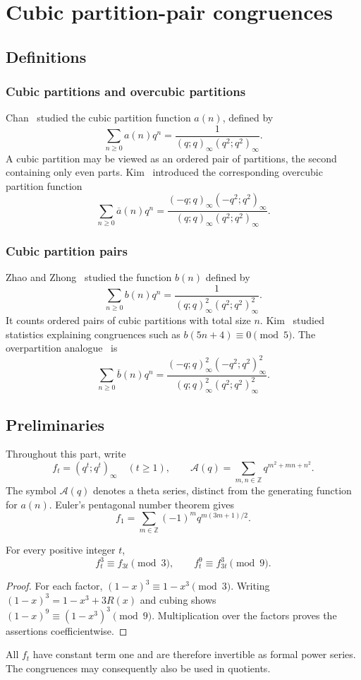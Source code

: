 \chapter{Cubic partition-pair congruences}
\section{Definitions}
\subsection{Cubic partitions and overcubic partitions}
Chan~\cite{chan1,chan2,chan3} studied the cubic partition function $a(n)$,
defined by
\[
 \sum_{n\ge0}a(n)q^n
 =\frac1{(q;q)_\infty(q^2;q^2)_\infty}.
\]
A cubic partition may be viewed as an ordered pair of partitions, the
second containing only even parts. Kim~\cite{kim1} introduced the
corresponding overcubic partition function
\[
 \sum_{n\ge0}\overline a(n)q^n
 =\frac{(-q;q)_\infty(-q^2;q^2)_\infty}
 {(q;q)_\infty(q^2;q^2)_\infty}.
\]

\subsection{Cubic partition pairs}
Zhao and Zhong~\cite{zhao1} studied the function $b(n)$ defined by
\begin{equation}\label{eq:b-gf}
 \sum_{n\ge0}b(n)q^n
 =\frac1{(q;q)_\infty^2(q^2;q^2)_\infty^2}.
\end{equation}
It counts ordered pairs of cubic partitions with total size $n$.
Kim~\cite{kim2} studied statistics explaining congruences such as
$b(5n+4)\equiv0\pmod5$.
The overpartition analogue~\cite{kim3} is
\[
 \sum_{n\ge0}\overline b(n)q^n
 =\frac{(-q;q)_\infty^2(-q^2;q^2)_\infty^2}
 {(q;q)_\infty^2(q^2;q^2)_\infty^2}.
\]

\section{Preliminaries}
Throughout this part, write
\[
 f_t=(q^t;q^t)_\infty\quad(t\ge1),\qquad
 \mathcal A(q)=\sum_{m,n\in\mathbb Z}q^{m^2+mn+n^2}.
\]
The symbol $\mathcal A(q)$ denotes a theta series, distinct from the
generating function for $a(n)$. Euler's pentagonal number theorem gives
\[
 f_1=\sum_{m\in\mathbb Z}(-1)^mq^{m(3m+1)/2}.
\]

\begin{lemma}\label{lem:product-congruences}
For every positive integer $t$,
\[
 f_t^3\equiv f_{3t}\pmod3,\qquad
 f_t^9\equiv f_{3t}^3\pmod9.
\]
\end{lemma}
\begin{proof}
For each factor, $(1-x)^3\equiv1-x^3\pmod3$. Writing
$(1-x)^3=1-x^3+3R(x)$ and cubing shows
$(1-x)^9\equiv(1-x^3)^3\pmod9$. Multiplication over the factors proves
the assertions coefficientwise.
\end{proof}
All $f_t$ have constant term one and are therefore invertible as formal
power series. The congruences may consequently also be used in quotients.

